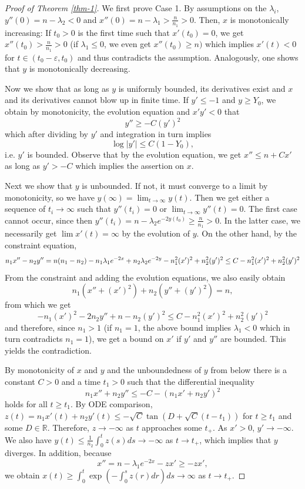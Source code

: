 \documentclass[a4paper,10pt]{article}
\theoremstyle{plain}
\theoremstyle{definition}
\theoremstyle{remark}
\theoremstyle{plain}
\newcommand{\R}{\mathbb{R}}
\newcommand{\eq}[1]{\begin{equation}#1\end{equation}}
\numberwithin{equation}{section}
\begin{document}
\begin{proof}[Proof of Theorem \ref{thm-1}]

\noindent
We first prove Case 1. By assumptions on the $\lambda_i$, $y''(0)=n-\lambda_2<0$ and $x''(0)=n-\lambda_1>\frac{n}{n_1}>0$. Then, $x$ is monotonically increasing: If $t_0>0$ is the first time such that $x'(t_0)=0$, we get $x''(t_0)>\frac{n}{n_1}>0$ (if $\lambda_1\leq0$, we even get $x''(t_0)\geq n)$ which implies $x'(t)<0$ for $t\in (t_0-\varepsilon,t_0)$ and thus contradicts the assumption. Analogously, one shows that $y$ is monotonically decreasing.
	
	Now we show that as long as $y$ is uniformly bounded, its derivatives exist and $x$ and its derivatives cannot blow up in finite time. If $y'\leq-1$ and $y\geq Y_0$, we obtain by monotonicity, the evolution equation and $x'y'<0$ that
	\eq{y''\geq -C (y')^2}
	which after dividing by $y'$ and integration in turn implies
	\eq{\log|y'|\leq C(1-Y_0),}
	i.e. $y'$ is bounded.
	Observe that by the evolution equation, we get $x''\leq n+Cx'$ as long as $y'>-C$ which implies the assertion on $x$. 
	
	Next we show that $y$ is unbounded. If not, it must converge to a limit by monotonicity, so we have $y(\infty)=\lim_{t\to\infty} y(t)$. Then we get either a sequence of $t_i\to\infty$ such that $y''(t_i)=0$ or $\lim_{t\to\infty} y''(t)=0$. The first case cannot occur, since then
	$y''(t_i)=n-\lambda_2e^{-2y(t_0)}\geq \frac{n}{n_1}>0$. In the latter case, we necessarily get $\lim x'(t)=\infty$ by the evolution of $y$. On the other hand, by the constraint equation,
	\eq{n_1x''-n_2y''=n(n_1-n_2)-n_1\lambda_1e^{-2x}+n_2\lambda_2e^{-2y}-n_1^2(x')^2+n_2^2(y')^2\\
		\leq C-n_1^2(x')^2+n_2^2(y')^2}
	From the constraint and adding the evolution equations, we also easily obtain
	\eq{n_1(x''+(x')^2)+n_2(y''+(y')^2)=n,} 
	from which we get
	\eq{-n_1(x')^2-2n_2y''+n-n_2(y')^2\leq C-n_1^2(x')^2+n_2^2(y')^2}
	and therefore, since $n_1>1$ (if $n_1=1$, the above bound implies $\lambda_1<0$ which in turn contradicts $n_1=1$), we get a bound on $x'$ if $y'$ and $y''$ are bounded. This yields the contradiction.
	
	By monotonicity of $x$ and $y$ and the unboundedness of $y$ from below there is a constant $C>0$ and a time $t_1>0$ such that the differential inequality 
	\eq{
		n_1x''+n_2y''\leq-C-(n_1x'+n_2y')^2
	}
	holds for all $t\geq t_1$. By ODE comparison,
	$z(t)=n_1x'(t)+n_2y'(t)\leq -\sqrt{C}\tan(D+\sqrt{C}(t-t_1))$ for $t\geq t_1$ and some $D\in\R$. Therefore, $z\to-\infty$ as $t$ approaches some $t_+$. As $x'>0$, $y'\to-\infty$. We also have $y(t)\leq\frac{1}{n_2}\int_0^{t}z(s)ds\to-\infty$ as $t\to t_+$, which implies that $y$ diverges.
	In addition, because
	\eq{x''=n-\lambda_1e^{-2x}-zx'\geq -zx',}
	we obtain $x(t)\geq \int_0^t\exp(-\int_0^sz(r)dr)ds\to \infty$ as $t\to t_+$.


\end{proof}
\end{document}
